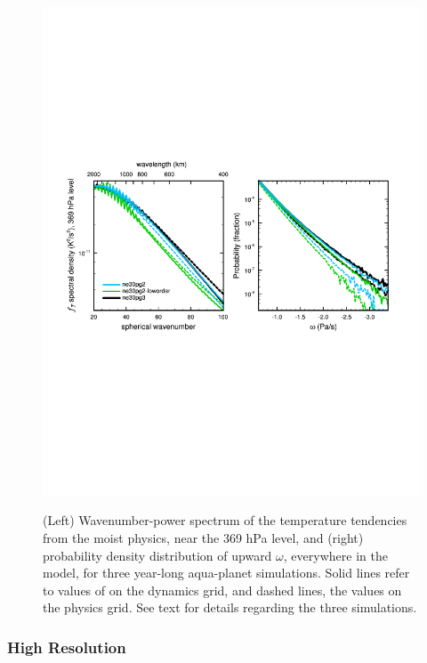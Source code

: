 \documentclass{agujournal}
\begin{document}
\begin{figure}[t]
\begin{center}
\noindent\includegraphics[width=30pc,angle=0]{figs/panel_loworder.pdf}\\
\end{center}
\caption{(Left) Wavenumber-power spectrum of the temperature tendencies from the moist physics, near the 369 hPa level, and (right) probability density distribution of upward $\omega$, everywhere in the model, for three year-long aqua-planet simulations.  Solid lines refer to values of on the dynamics grid, and dashed lines, the values on the physics grid. See text for details regarding the three simulations.}
\label{fig:loworder}
\end{figure}

\subsubsection{High Resolution}\label{sec:highres}
\end{document}
